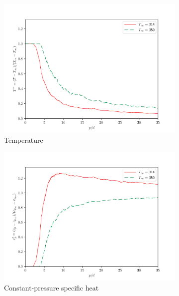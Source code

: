 \begin{figure}[H]
\begin{center}
\begin{subfigure}{0.45\textwidth}
	\includegraphics[scale=.45]{figures/Plots/centerline/temp_centerline_scaled.pdf}
	\caption{Temperature} \label{noniso_temp_centerline_1}
\end{subfigure}
\begin{subfigure}{0.45\textwidth}
	\includegraphics[scale=.45]{figures/Plots/centerline/cp_centerline_scaled.pdf}
	\caption{Constant-pressure specific heat} \label{noniso_cp_centerline_1}
\end{subfigure}
\vfill
\begin{subfigure}{0.45\textwidth}

\end{subfigure}
\end{center}
\end{figure}
